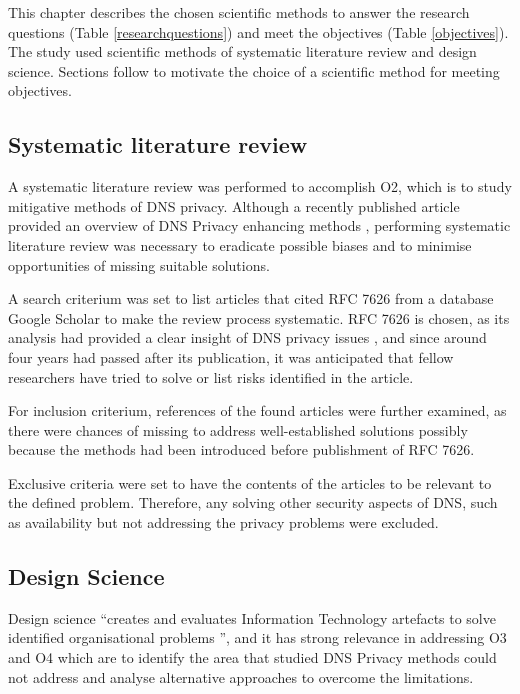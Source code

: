 
This chapter describes the chosen scientific methods to answer the research questions (Table \ref{researchquestions}) and meet the objectives (Table \ref{objectives}).
The study used scientific methods of systematic literature review and design science.
Sections follow to motivate the choice of a scientific method for meeting objectives.
\subsection{Systematic literature review}
A systematic literature review was performed to accomplish O2, which is to study mitigative methods of DNS privacy. Although a recently published article provided an overview of DNS Privacy enhancing methods \cite{van2018privacy}, performing systematic literature review was necessary to eradicate possible biases and to minimise opportunities of missing suitable solutions.

A search criterium was set to list articles that cited RFC 7626 from a database Google Scholar to make the review process systematic. RFC 7626 is chosen, as its analysis had provided a clear insight of DNS privacy issues \cite{rfc7626}, and since around four years had passed after its publication, it was anticipated that fellow researchers have tried to solve or list risks identified in the article.

For inclusion criterium, references of the found articles were further examined, as there were chances of missing to address well-established solutions possibly because the methods had been introduced before publishment of RFC 7626.

Exclusive criteria were set to have the contents of the articles to be relevant to the defined problem. Therefore, any solving other security aspects of DNS, such as availability but not addressing the privacy problems were excluded.

\subsection{Design Science}
Design science ``creates and evaluates Information Technology artefacts to solve identified organisational problems \cite{von2004design}'', and it has strong relevance in addressing O3 and O4 which are to identify the area that studied DNS Privacy methods could not address and analyse alternative approaches to overcome the limitations.

